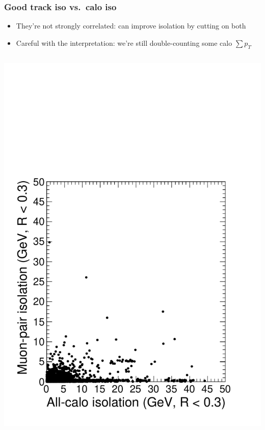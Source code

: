 \documentclass[compress]{beamer}
\begin{document}
\begin{frame}
\frametitle{Good track iso vs.\ calo iso}

\begin{itemize}
\item They're not strongly correlated: can improve isolation by cutting on both
\item Careful with the interpretation: we're still double-counting some calo $\sum p_{T}$
\end{itemize}

\begin{columns}
\includegraphics[width=\linewidth]{bubbleiso_vs_caloiso.pdf}

\end{columns}
\end{frame}
\end{document}
